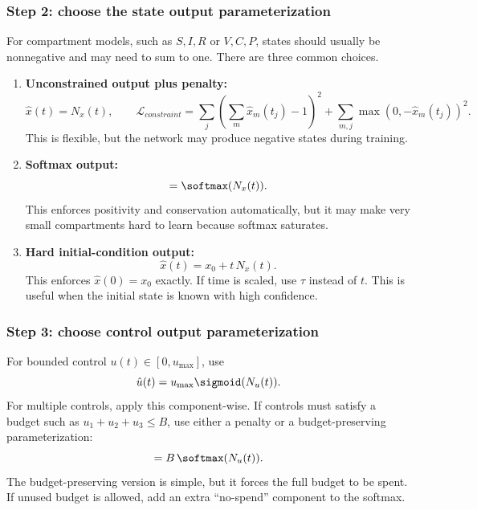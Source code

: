 \documentclass[11pt,a4paper]{article}
\begin{document}
\subsubsection*{Step 2: choose the state output parameterization}
For compartment models, such as $S,I,R$ or $V,C,P$, states should usually be nonnegative and may need to sum to one. There are three common choices.
\begin{enumerate}[leftmargin=2em]
    \item \textbf{Unconstrained output plus penalty:}
    \begin{equation}
        \hat{x}(t)=N_x(t),\qquad
        \mathcal{L}_{constraint}=\sum_j \left(\sum_m \hat{x}_m(t_j)-1\right)^2+\sum_{m,j}\max(0,-\hat{x}_m(t_j))^2.
    \end{equation}
    This is flexible, but the network may produce negative states during training.
    \item \textbf{Softmax output:}
    \begin{equation}
        [\hat{S},\hat{I},\hat{R}]=\softmax(N_x(t)).
    \end{equation}
    This enforces positivity and conservation automatically, but it may make very small compartments hard to learn because softmax saturates.
    \item \textbf{Hard initial-condition output:}
    \begin{equation}
        \hat{x}(t)=x_0+t\,N_x(t).
    \end{equation}
    This enforces $\hat{x}(0)=x_0$ exactly. If time is scaled, use $\tau$ instead of $t$. This is useful when the initial state is known with high confidence.
\end{enumerate}

\subsubsection*{Step 3: choose control output parameterization}
For bounded control $u(t)\in[0,u_{\max}]$, use
\begin{equation}
    \hat{u}(t)=u_{\max}\sigmoid(N_u(t)).
\end{equation}
For multiple controls, apply this component-wise. If controls must satisfy a budget such as $u_1+u_2+u_3\leq B$, use either a penalty or a budget-preserving parameterization:
\begin{equation}
    [\hat{u}_1,\hat{u}_2,\hat{u}_3]=B\,\softmax(N_u(t)).
\end{equation}
The budget-preserving version is simple, but it forces the full budget to be spent. If unused budget is allowed, add an extra ``no-spend'' component to the softmax.
\end{document}
